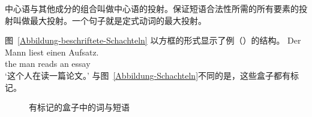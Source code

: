 中心语与其他成分的组合叫做中心语的投射。保证短语合法性所需的所有要素的投射叫做最大投射。一个句子就是定式动词的最大投射。

图~\vref{Abbildung-beschriftete-Schachteln} 以方框的形式显示了例（）的结构。
\ea
\gll Der Mann liest einen Aufsatz.\\
	 the man reads an essay\\
\glt `这个人在读一篇论文。'
\z
与图~\ref{Abbildung-Schachteln}不同的是，这些盒子都有标记。
\begin{figure}
\centering
{}
\caption{\label{Abbildung-beschriftete-Schachteln}有标记的盒子中的词与短语}
\end{figure}%

